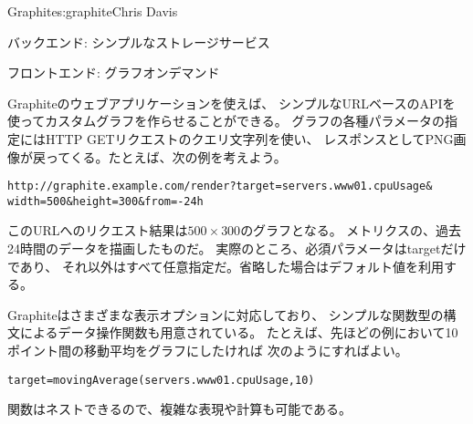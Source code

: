 \begin{aosachapter}{Graphite}{s:graphite}{Chris Davis}
\begin{aosasect1}{バックエンド: シンプルなストレージサービス}
\end{aosasect1}

\begin{aosasect1}{フロントエンド: グラフオンデマンド}

Graphiteのウェブアプリケーションを使えば、
シンプルなURLベースのAPIを使ってカスタムグラフを作らせることができる。
グラフの各種パラメータの指定にはHTTP GETリクエストのクエリ文字列を使い、
レスポンスとしてPNG画像が戻ってくる。たとえば、次の例を考えよう。

\begin{verbatim}
http://graphite.example.com/render?target=servers.www01.cpuUsage&
width=500&height=300&from=-24h
\end{verbatim}

\noindent
このURLへのリクエスト結果は$500{\times}300$のグラフとなる。
メトリクスの、過去24時間のデータを描画したものだ。
実際のところ、必須パラメータはtargetだけであり、
それ以外はすべて任意指定だ。省略した場合はデフォルト値を利用する。

Graphiteはさまざまな表示オプションに対応しており、
シンプルな関数型の構文によるデータ操作関数も用意されている。
たとえば、先ほどの例において10ポイント間の移動平均をグラフにしたければ
次のようにすればよい。

\begin{verbatim}
target=movingAverage(servers.www01.cpuUsage,10)
\end{verbatim}

\noindent
関数はネストできるので、複雑な表現や計算も可能である。

\pagebreak


\end{aosasect1}
\end{aosachapter}
